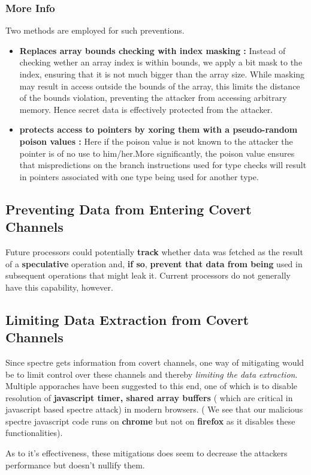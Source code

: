 \documentclass[12pt]{article}
\begin{document}
\subsubsection{More Info}
Two methods are employed for such preventions.
\begin{itemize}
	\item \textbf{Replaces array bounds checking with index masking	:} Instead of checking wether an array index is within bounds, we apply a bit mask to the index, ensuring that it is not much bigger than the array size. While masking may result in access outside the bounds of the array, this limits the distance of the bounds violation, preventing the attacker from accessing arbitrary memory. Hence secret data is effectively protected from the attacker.
	\item \textbf{protects access to pointers by xoring them with a pseudo-random poison values	:} Here if the poison value is not known to the attacker the pointer is of no use to him/her.More significantly, the poison value ensures that mispredictions on the branch instructions used for type checks will result in pointers associated with one type being used for another type.
\end{itemize}
\subsection{Preventing Data from Entering Covert Channels}
Future processors could potentially \textbf{track} whether data was
fetched as the result of a \textbf{speculative} operation and, \textbf{if so},
\textbf{prevent that data from being} used in subsequent operations
that might leak it. Current processors do not generally have
this capability, however.
\subsection{Limiting Data Extraction from Covert Channels}
Since spectre gets information from covert channels, one way of mitigating would be to limit control over these channels and thereby \textit{limiting the data extraction}. Multiple apporaches have been suggested to this end, one of which is to disable resolution of \textbf{javascript timer, shared array buffers} ( which are critical in javascript based spectre attack) in modern browsers. ( We see that our malicious spectre javascript code runs on \textbf{chrome} but not on \textbf{firefox} as it disables these functionalities).

As to it's effectiveness, these mitigations does seem to decrease the attackers performance but doesn't nullify them.
\end{document}
